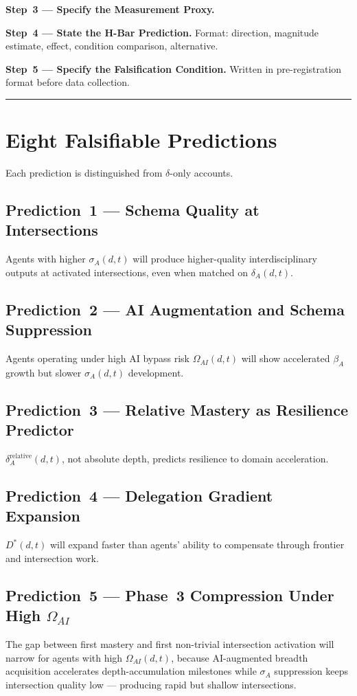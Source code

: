 \documentclass[11pt,a4paper]{article}
\begin{document}
\textbf{Step~3 --- Specify the Measurement Proxy.}

\textbf{Step~4 --- State the H-Bar Prediction.} Format: direction,
magnitude estimate, effect, condition comparison, alternative.

\textbf{Step~5 --- Specify the Falsification Condition.} Written in
pre-registration format before data collection.

\noindent\rule{\linewidth}{0.4pt}

\section{Eight Falsifiable Predictions}\label{sec:predictions}

Each prediction is distinguished from $\delta$-only accounts.

\subsection{Prediction~1 --- Schema Quality at Intersections}
Agents with higher $\sigma_A(d,t)$ will produce higher-quality
interdisciplinary outputs at activated intersections, even when matched
on $\delta_A(d,t)$.

\subsection{Prediction~2 --- AI Augmentation and Schema Suppression}
Agents operating under high AI bypass risk $\Omega_{AI}(d,t)$ will show accelerated $\beta_A$
growth but slower $\sigma_A(d,t)$ development.

\subsection{Prediction~3 --- Relative Mastery as Resilience Predictor}
$\delta_A^{\text{relative}}(d,t)$, not absolute depth, predicts
resilience to domain acceleration.

\subsection{Prediction~4 --- Delegation Gradient Expansion}
$D^*(d,t)$ will expand faster than agents' ability to compensate through
frontier and intersection work.

\subsection{Prediction~5 --- Phase~3 Compression Under High \texorpdfstring{$\Omega_{AI}$}{Omega\_AI}}
The gap between first mastery and first non-trivial intersection
activation will narrow for agents with high $\Omega_{AI}(d,t)$, because AI-augmented breadth acquisition accelerates depth-accumulation milestones while $\sigma_A$ suppression keeps intersection quality low --- producing rapid but shallow intersections.
\end{document}
